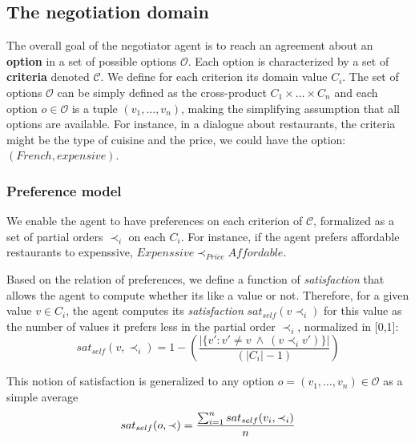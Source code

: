 \documentclass[runningheads,a4paper]{llncs}
\begin{document}
	\subsection{The negotiation domain}
	
	The overall goal of the negotiator agent is to reach an agreement about an \textbf{option} in a set of possible options $\mathcal{O}$. 
	Each option is characterized by a set of \textbf{criteria} denoted $\mathcal{C}$. We define for each criterion its domain value $C_i$.
	The set of options $\mathcal{O}$ can be simply defined as the cross-product $C_1\times\ldots\times C_n$ and each option $o\in\mathcal{O}$ is a tuple $(v_1,\ldots,v_n)$, making the simplifying assumption that all options are available. For instance, in a dialogue about restaurants, the criteria might be the type of cuisine and the price, we could have the option: $(French,expensive)$.
	
	\subsubsection{Preference model} 
	We enable the agent to have preferences on each criterion of $\mathcal{C}$, formalized as a set of partial orders $\prec_i$ on each $C_i$. For instance, if the agent prefers affordable restaurants to expenssive, $Expenssive\prec_{Price}Affordable$.
	
	Based on the relation of preferences, we define a function of \emph{satisfaction} that allows the agent to compute whether its like a value or not. Therefore, for a given value $v\in C_i$, the agent computes its \emph{satisfaction} $sat_{self}(v \prec_i)$ for this value as the number of values it prefers less in the partial order $\prec_i$, normalized in [0,1]:
	\vspace{-.5em} 
	\begin{equation}
	sat_{self}(v, \prec_i) =	1 - \left( \frac{|\{v' : v' \neq v \  \wedge \ (v \prec_i v')\}| }{( |C_i| - 1 )}\right)
	\end{equation}
	
	This notion of satisfaction is generalized to any option $o= (v_1, \ldots, v_n)\in \mathcal{O}$ as a simple average
	\vspace{-1em} 
	\begin{equation}
	sat_{self}(o, \prec) = \frac{\sum_{i=1}^{n} sat_{self}(v_i, \prec_i) }{n}
	\vspace{-1.5em} 
	\end{equation}
	
	
\end{document}
